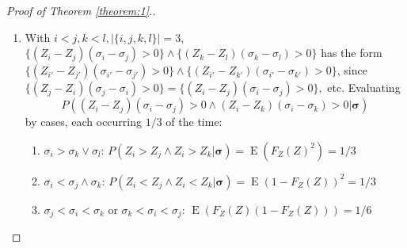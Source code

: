 \documentclass[12pt]{article}
\renewcommand{\P}{P}
\newcommand{\z}{Z}
\newcommand{\s}{S}
\DeclareMathOperator{\E}{E}
\begin{document}
\begin{proof}[Proof of Theorem \ref{theorem:1}.]
\begin{enumerate}[wide, labelwidth=!, labelindent=0pt]
\begin{enumerate}[wide, labelwidth=!, labelindent=0pt]
\begin{align}
    &\qquad\le 8n{n\choose 2}^{-2}\sum_{\substack{i<j\\k<l\\|\left\{i,j,k,l\right\}|=3}}
    F_{|\z_i-\z_j|}(|\s_i-\s_j|n^a) + 32\frac{n-2}{n-1}\P(|\theta-\hat\theta|>n^a).\label{theorem:1:step:1:a:l1}
  \end{align}
  The variable $a$ in \eqref{theorem:1:step:1:a:l1} may be any number in $(-1/2,0)$. As $\z_i-\z_j \sim \mathcal{N}(0,2)$, the CDF $F_{|\z_i-\z_j|}(x)=O(x)$ near $0$, so that the \eqref{theorem:1:step:1:a:l1} is
  \begin{align}
    &\lesssim 8n{n\choose 2}^{-2}n^a\sum_{\substack{i<j\\k<l\\|\left\{i,j,k,l\right\}|=3}}
    |\s_i-\s_j|\wedge 1+o(1)\\
    &\le 16n(n-2){n\choose 2}^{-2}n^a\sum_{i<j}
    |\s_i-\s_j|\wedge 1+o(1).\label{theorem:1:step:1:a:l:2},
  \end{align}
  The normalized double sum ${n\choose 2}^{-2}n^a\sum_{i<j} |\s_i-\s_j|$ is shown to be $O(1)$ in step \ref{theorem:1:step:2}, so that the expression \eqref{theorem:1:step:1:a:l:2} is $=n^aO(1)=o(1)$.
  

\item\label{theorem:1:step:1:b}

  With $i<j,k<l,|\{i,j,k,l\}|=3$, $\{(\z_i-\z_j)(\sigma_i-\sigma_j)>0\}\wedge\{(\z_k-\z_l)(\sigma_k-\sigma_l)>0\}$ has the form $\{(\z_{i'}-\z_{j'})(\sigma_{i'}-\sigma_{j'})>0\}\wedge\{(\z_{i'}-\z_{k'})(\sigma_{i'}-\sigma_{k'})>0\}$, since $\{(\z_j-\z_i)(\sigma_j-\sigma_i)>0\}=\{(\z_i-\z_j)(\sigma_i-\sigma_j)>0\},$ etc. Evaluating $$\P\left((\z_i-\z_j)(\sigma_i-\sigma_j)>0 \wedge (\z_i-\z_k)(\sigma_i-\sigma_k)>0 | \pmb{\sigma}\right)$$  by cases, each occurring $1/3$ of the time:
  \begin{enumerate}
  \item $\sigma_i > \sigma_k \vee \sigma_l$:
$
      P(\z_i>\z_j \wedge \z_i>\z_k | \pmb{\sigma})=\E(F_\z(\z)^2)=1/3$
    \item $\sigma_i < \sigma_j \wedge \sigma_k$: $\P(\z_i<\z_j \wedge \z_i<\z_k | \pmb{\sigma})=\E(1-F_\z(\z))^2=1/3$
    \item $\sigma_j<\sigma_i<\sigma_k$ or $\sigma_k<\sigma_i<\sigma_j$: $\E(F_\z(\z)(1-F_\z(\z)))=1/6$
  \end{enumerate}


\end{enumerate}
\end{enumerate}
\end{proof}
\end{document}
